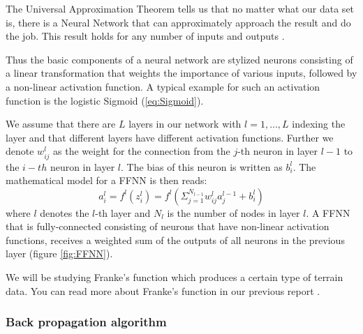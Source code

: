 \documentclass[a4paper, UKenglish, 11pt]{uiomaster}
\begin{document}
The Universal Approximation Theorem tells us that no matter what our data set is, there is a Neural Network that can approximately approach the result and do the job. This result holds for any number of inputs and outputs \cite{95}.

Thus the basic components of a neural network are stylized neurons consisting of a linear transformation that weights the importance of various inputs, followed by a non-linear activation function. A typical example for such an activation function is the logistic Sigmoid (\ref{eq:Sigmoid}).

We assume that there are $L$ layers in our network with $l = 1,...,L$ indexing the layer and that different layers have different activation functions. Further we denote $w^l_{ij}$ as the weight for the connection from the $j$-th neuron in layer $l-1$ to the $i-th$ neuron in layer $l$. The bias of this neuron is written as $b^l_i$. The mathematical model for a FFNN is then reads:
\begin{equation}
    a_i^l = f^l(z_i^l) = f^l \left(\Sigma_{j=1}^{N_{l-1}}w_{ij}^l a_j^{l-1} + b_i^l\right)
\label{eq:FFNN}
\end{equation}
where $l$ denotes the $l$-th layer and $N_l$ is the number of nodes in layer $l$. A FFNN that is fully-connected consisting of neurons that have non-linear activation functions, receives a weighted sum of the outputs of all neurons in the previous layer (figure \ref{fig:FFNN}). %


We will be studying Franke's function which produces a certain type of terrain data. You can read more about Franke's function in our previous report \cite{97}.


\subsubsection*{Back propagation algorithm}
\end{document}
